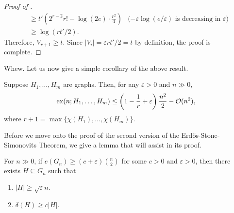 \documentclass{article}
\begin{document}
\begin{proof}[Proof of ]
\begin{align*}
					&\ge t' \left( 2^{r-2} r! - \log(2e) \cdot \frac{r^2}{4} \right) & \text{($-\varepsilon \log(e/\varepsilon)$ is decreasing in $\varepsilon$)} \\
					&\ge \log(rt'/2).
				\end{align*}
				Therefore, $V_{r+1} \ge t$. Since $|V_i| = \varepsilon rt'/2 = t$ by definition, the proof is complete.
			\end{proof}

			Whew. Let us now give a simple corollary of the above result.

			\begin{fpor}
				Suppose $H_1,\ldots,H_m$ are graphs. Then, for any $\varepsilon > 0$ and $n \gg 0$,
				\[ \operatorname{ex}(n;H_1,\ldots,H_m) \le \left(1 - \frac{1}{r} + \varepsilon\right)\frac{n^2}{2} - \mathcal{O}(n^2), \]
				where $r+1=\max\{\chi(H_1),\ldots,\chi(H_m)\}$.
			\end{fpor}


			Before we move onto the proof of the second version of the Erd\H{o}s-Stone-Simonovits Theorem, we give a lemma that will assist in its proof.

			\begin{flem}
				For $n\gg 0$, if $e(G_n) \ge (c+\varepsilon)\binom{n}{2}$ for some $c > 0$ and $\varepsilon > 0$, then there exists $H\subseteq G_n$ such that
				\begin{enumerate}
					\item $|H| \ge \sqrt{\varepsilon} n$.
					\item $\delta(H) \ge c|H|$.
				\end{enumerate}
			\end{flem}
\end{document}

